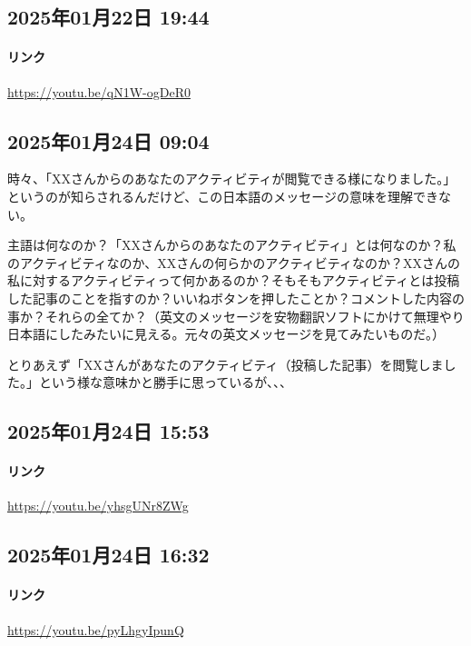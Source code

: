 \subsection*{2025年01月22日 19:44}

\paragraph{リンク}
\url{https://youtu.be/qN1W-ogDeR0}

\subsection*{2025年01月24日 09:04}

時々、「XXさんからのあなたのアクティビティが閲覧できる様になりました。」というのが知らされるんだけど、この日本語のメッセージの意味を理解できない。

主語は何なのか？「XXさんからのあなたのアクティビティ」とは何なのか？私のアクティビティなのか、XXさんの何らかのアクティビティなのか？XXさんの私に対するアクティビティって何かあるのか？そもそもアクティビティとは投稿した記事のことを指すのか？いいねボタンを押したことか？コメントした内容の事か？それらの全てか？（英文のメッセージを安物翻訳ソフトにかけて無理やり日本語にしたみたいに見える。元々の英文メッセージを見てみたいものだ。）

とりあえず「XXさんがあなたのアクティビティ（投稿した記事）を閲覧しました。」という様な意味かと勝手に思っているが、、、

\subsection*{2025年01月24日 15:53}

\paragraph{リンク}
\url{https://youtu.be/yhsgUNr8ZWg}

\subsection*{2025年01月24日 16:32}

\paragraph{リンク}
\url{https://youtu.be/pyLhgyIpunQ}

